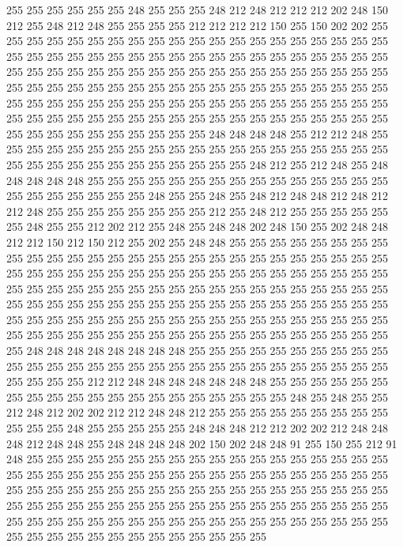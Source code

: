255 255 255 255 255 255 248 255 255 255 248 212 248 212 212 212 202 248 150 212
255 248 212 248 255 255 255 255 212 212 212 212 150 255 150 202 202 255 255 255
255 255 255 255 255 255 255 255 255 255 255 255 255 255 255 255 255 255 255 255
255 255 255 255 255 255 255 255 255 255 255 255 255 255 255 255 255 255 255 255
255 255 255 255 255 255 255 255 255 255 255 255 255 255 255 255 255 255 255 255
255 255 255 255 255 255 255 255 255 255 255 255 255 255 255 255 255 255 255 255
255 255 255 255 255 255 255 255 255 255 255 255 255 255 255 255 255 255 255 255
255 255 255 255 255 255 255 255 255 255 255 255 255 255 255 255 255 255 255 255
255 255 248 248 248 248 255 212 212 248 255 255 255 255 255 255 255 255 255 255
255 255 255 255 255 255 255 255 255 255 255 255 255 255 255 255 255 255 255 255
255 255 248 212 255 212 248 255 248 248 248 248 248 255 255 255 255 255 255 255
255 255 255 255 255 255 255 255 255 255 255 255 255 255 255 248 255 255 248 255
248 212 248 248 212 248 212 212 248 255 255 255 255 255 255 255 255 212 255 248
212 255 255 255 255 255 255 248 255 255 212 202 212 255 248 255 248 248 202 248
150 255 202 248 248 212 212 150 212 150 212 255 202 255 248 248 255 255 255 255
255 255 255 255 255 255 255 255 255 255 255 255 255 255 255 255 255 255 255 255
255 255 255 255 255 255 255 255 255 255 255 255 255 255 255 255 255 255 255 255
255 255 255 255 255 255 255 255 255 255 255 255 255 255 255 255 255 255 255 255
255 255 255 255 255 255 255 255 255 255 255 255 255 255 255 255 255 255 255 255
255 255 255 255 255 255 255 255 255 255 255 255 255 255 255 255 255 255 255 255
255 255 255 255 255 255 255 255 255 255 255 255 255 255 255 255 255 255 255 248
248 248 248 248 248 248 248 255 255 255 255 255 255 255 255 255 255 255 255 255
255 255 255 255 255 255 255 255 255 255 255 255 255 255 255 255 255 255 255 255
212 212 248 248 248 248 248 248 248 255 255 255 255 255 255 255 255 255 255 255
255 255 255 255 255 255 255 255 255 248 255 248 255 255 212 248 212 202 202 212
212 248 248 212 255 255 255 255 255 255 255 255 255 255 255 255 248 255 255 255
255 255 248 248 248 212 212 202 202 212 248 248 248 212 248 248 255 248 248 248
248 202 150 202 248 248 91 255 150 255 212 91 248 255 255 255 255 255 255 255
255 255 255 255 255 255 255 255 255 255 255 255 255 255 255 255 255 255 255 255
255 255 255 255 255 255 255 255 255 255 255 255 255 255 255 255 255 255 255 255
255 255 255 255 255 255 255 255 255 255 255 255 255 255 255 255 255 255 255 255
255 255 255 255 255 255 255 255 255 255 255 255 255 255 255 255 255 255 255 255
255 255 255 255 255 255 255 255 255 255 255 255 255 255 255 255 255 255 255 255
